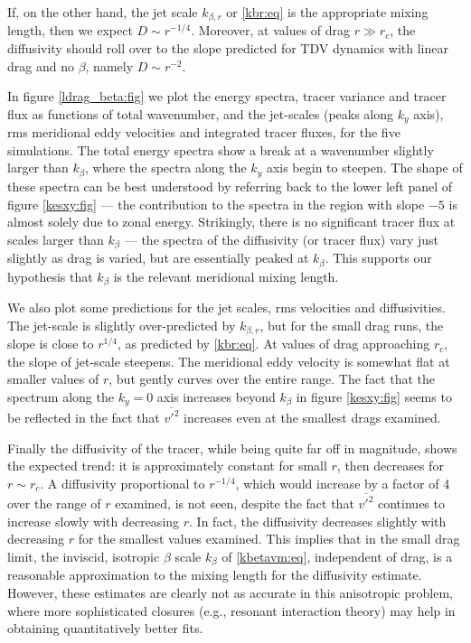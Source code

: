 \documentclass{jfm}
\begin{document}
If, on the other hand, the jet scale $k_{\beta,r}$ or
\eqref{kbr:eq} is the appropriate mixing length, then we expect
$D\sim r^{-1/4}$. Moreover, at values of drag $r\gg r_c$, the
diffusivity should roll over to the slope predicted for TDV
dynamics with linear drag and no $\beta$, namely $D \sim r^{-2}$.

In figure \ref{ldrag_beta:fig} we plot the energy spectra, tracer
variance and tracer flux as functions of total wavenumber, and the
jet-scales (peaks along $k_y$ axis), rms meridional eddy velocities
and integrated tracer fluxes, for the five simulations.  The total
energy spectra show a break at a wavenumber slightly larger than
$k_{\beta}$, where the spectra along the $k_y$ axis begin to steepen.
The shape of these spectra can be best understood by referring back to
the lower left panel of figure \ref{kesxy:fig} --- the contribution to
the spectra in the region with slope $-5$ is almost solely due to
zonal energy.  Strikingly, there is no significant tracer flux at
scales larger than $k_{\beta}$ --- the spectra of the diffusivity (or
tracer flux) vary just slightly as drag is varied, but are essentially
peaked at $k_{\beta}$.  This supports our hypothesis that $k_{\beta}$
is the relevant meridional mixing length.

We also plot some predictions for the jet scales, rms velocities and
diffusivities. The jet-scale is slightly over-predicted by
$k_{\beta,r}$, but for the small drag runs, the slope is close to
$r^{1/4}$, as predicted by \eqref{kbr:eq}.  At values of drag
approaching $r_c$, the slope of jet-scale steepens. The meridional
eddy velocity is somewhat flat at smaller values of $r$, but gently
curves over the entire range.  The fact that the spectrum along the
$k_y=0$ axis increases beyond $k_{\beta}$ in figure \ref{kesxy:fig}
seems to be reflected in the fact that $\overline{v'^2}$ increases
even at the smallest drags examined.

Finally the diffusivity of the tracer, while being quite far off in
magnitude, shows the expected trend: it is approximately constant for
small $r$, then decreases for $r\sim r_c$.  A diffusivity proportional
to $r^{-1/4}$, which would increase by a factor of 4 over the range of
$r$ examined, is not seen, despite the fact that $\overline{v'^2}$
continues to increase slowly with decreasing $r$. In fact, the
diffusivity decreases slightly with decreasing $r$ for the smallest
values examined.  This implies that in the small drag limit, the
inviscid, isotropic $\beta$ scale $k_{\beta}$ of \eqref{kbetavm:eq},
independent of drag, is a reasonable approximation to the mixing
length for the diffusivity estimate.  However, these estimates are
clearly not as accurate in this anisotropic problem, where more
sophisticated closures (e.g., resonant interaction theory) may help in
obtaining quantitatively better fits.
\end{document}
